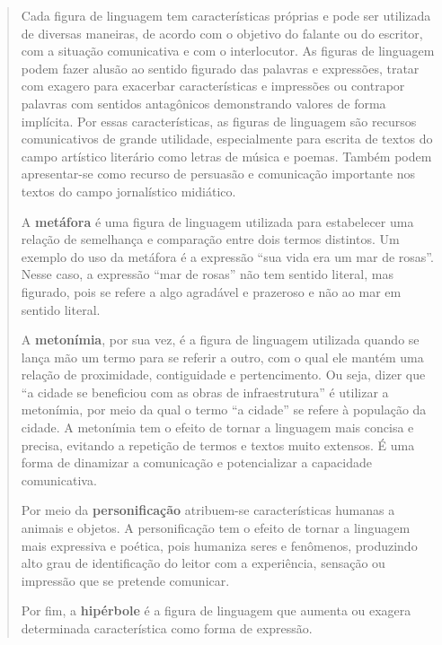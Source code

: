 \begin{quote}
{Cada figura de linguagem tem características próprias e pode ser
utilizada de diversas maneiras, de acordo com o objetivo do falante ou
do escritor, com a situação comunicativa e com o interlocutor. As
figuras de linguagem podem fazer alusão ao sentido figurado das palavras
e expressões, tratar com exagero para exacerbar características e
impressões ou contrapor palavras com sentidos antagônicos demonstrando
valores de forma implícita. Por essas características, as figuras de
linguagem são recursos comunicativos de grande utilidade, especialmente
para escrita de textos do campo artístico literário como letras de
música e poemas. Também podem apresentar-se como recurso de persuasão e
comunicação importante nos textos do campo jornalístico
midiático.

A \textbf{metáfora} é uma figura de linguagem utilizada para
estabelecer uma relação de semelhança e comparação entre dois termos
distintos. Um exemplo do uso da metáfora é a expressão ``sua vida era um
mar de rosas''. Nesse caso, a expressão ``mar de rosas'' não tem sentido
literal, mas figurado, pois se refere a algo agradável e
prazeroso e não ao mar em sentido literal.

A \textbf{metonímia}, por sua vez, é a figura de linguagem utilizada quando se
lança mão um termo para se referir a outro, com o qual ele mantém uma
relação de proximidade, contiguidade e pertencimento. Ou seja, dizer que
``a cidade se beneficiou com as obras de infraestrutura'' é utilizar a metonímia,
por meio da qual o termo ``a cidade'' se refere à população da cidade. A metonímia
tem o efeito de tornar a linguagem mais concisa e precisa, evitando a repetição de
termos e textos muito extensos. É uma forma de dinamizar a comunicação e
potencializar a capacidade comunicativa.

Por meio da \textbf{personificação} atribuem-se características humanas a animais
e objetos. A personificação tem o efeito de tornar a linguagem mais expressiva e 
poética, pois humaniza seres e fenômenos, produzindo alto grau de identificação do
leitor com a experiência, sensação ou impressão que se pretende comunicar.

Por fim, a \textbf{hipérbole} é a figura de linguagem que aumenta ou exagera
determinada característica como forma de expressão.


}
\end{quote}
